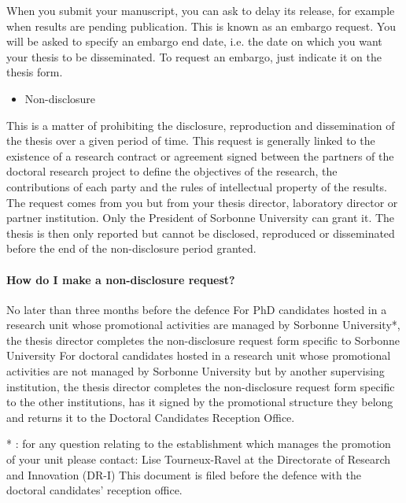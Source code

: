 When you submit your manuscript, you can ask to delay its release, for example when results are pending publication. This is known as an embargo request. You will be asked to specify an embargo end date, i.e. the date on which you want your thesis to be disseminated.
To request an embargo, just indicate it on the thesis form.

\begin{itemize}
    \item Non-disclosure
\end{itemize}

This is a matter of prohibiting the disclosure, reproduction and dissemination of the thesis over a given period of time. This request is generally linked to the existence of a research contract or agreement signed between the partners of the doctoral research project to define the objectives of the research, the contributions of each party and the rules of intellectual property of the results. The request comes from you but from your thesis director, laboratory director or partner institution. Only the President of Sorbonne University can grant it.
The thesis is then only reported but cannot be disclosed, reproduced or disseminated before the end of the non-disclosure period granted.

\paragraph{How do I make a non-disclosure request? }
No later than three months before the defence
For PhD candidates hosted in a research unit whose promotional activities are managed by Sorbonne University*, the thesis director completes the non-disclosure request form specific to Sorbonne University
For doctoral candidates hosted in a research unit whose promotional activities are not managed by Sorbonne University but by another supervising institution, the thesis director completes the non-disclosure request form specific to the other institutions, has it signed by the promotional structure they belong and returns it to the Doctoral Candidates Reception Office.

* : for any question relating to the establishment which manages the promotion of your unit please contact: Lise Tourneux-Ravel at the Directorate of Research and Innovation (DR-I)
This document is filed before the defence with the doctoral candidates' reception office.

